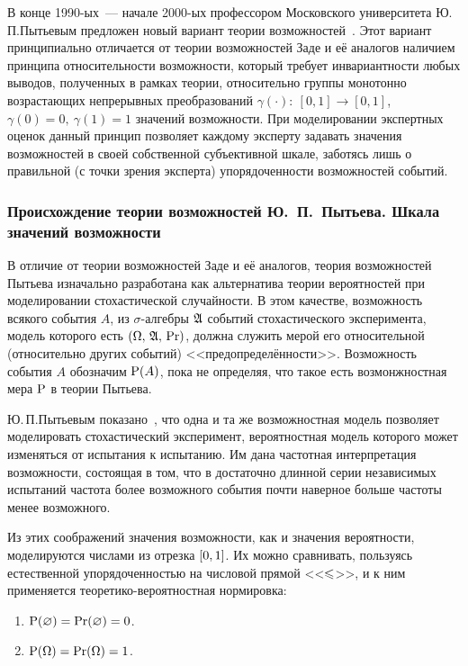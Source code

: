 В конце 1990-ых~--- начале 2000-ых профессором Московского университета Ю.\,П.\;Пытьевым предложен новый вариант теории возможностей~\cite{possbook, cit:smf, probbook, pytyev_experts}. Этот вариант принципиально отличается от теории возможностей Заде и её аналогов наличием принципа относительности возможности, который требует инвариантности любых выводов, полученных в рамках теории, относительно группы монотонно возрастающих непрерывных преобразований $\gamma(\cdot):\ [0,1]\to[0,1]$, $\gamma(0) = 0,\ \gamma(1) = 1$ значений возможности. При моделировании экспертных оценок данный принцип позволяет каждому эксперту задавать значения возможностей в своей собственной субъективной шкале, заботясь лишь о правильной (с точки зрения эксперта) упорядоченности возможностей событий.

\subsubsection{Происхождение теории возможностей Ю.~П.~Пытьева. Шкала значений возможности}

В отличие от теории возможностей Заде и её аналогов, теория возможностей Пытьева изначально разработана как альтернатива теории вероятностей при моделировании стохастической случайности.  В этом качестве, возможность всякого события $A$, из $\sigma$-алгебры $\Alg$ событий стохастического эксперимента, модель которого есть $\OAPr$, должна служить мерой его относительной (относительно других событий) <<предопределённости>>. Возможность события $A$ обозначим $\P(A)$, пока не определяя, что такое есть возмонжностная мера $\P$ в теории Пытьева. 
\begin{notice}
Ю.\,П.\;Пытьевым показано~\cite{possbook2}, что одна и та же возможностная модель позволяет моделировать стохастический эксперимент, вероятностная модель которого может изменяться от испытания к испытанию.  Им дана частотная интерпретация возможности, состоящая в том, что в достаточно длинной серии независимых испытаний частота более возможного события почти наверное больше частоты менее возможного. 
\end{notice}

Из этих соображений значения возможности,  как и значения вероятности, моделируются числами из отрезка $\zo$. Их можно сравнивать, пользуясь естественной упорядоченностью на числовой прямой <<$\leqs$>>, и к ним применяется теоретико-вероятностная нормировка:
\begin{enumerate}
\item\label{item_poss_rel_1}
    $\P(\varnothing) = \Pr(\varnothing) = 0$.
\item\label{item_poss_rel_2}
    $\P(\Omega) = \Pr(\Omega) = 1$.
\end{enumerate}


